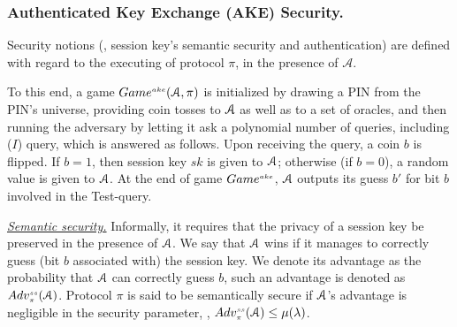 %
%
%
%
%
%
%
%
%
%
%
%
%
%  
%  
%  

 \vspace{-1mm}
\subsubsection{Authenticated Key Exchange (AKE)  Security.} Security notions (\ie, session key's semantic security and authentication) are defined with regard to the executing of protocol $\pi$, in the presence of   $\mathcal{A}$. 


To this end, a game $Game^{\scriptscriptstyle ake} (\mathcal{A},\pi)$ is initialized by drawing a PIN  from the PIN's universe,
providing coin tosses to $\mathcal{A}$ as well as to a set of oracles, and then running the adversary by letting it ask a polynomial
number of queries, including \test($I$) query, which is answered as follows. Upon receiving the query, a coin $b$ is flipped. If $b=1$, then session key $sk$ is given to $\mathcal{A}$; otherwise (if $b=0$), a random value is given to $\mathcal{A}$. At the end of game $Game^{\scriptscriptstyle ake}$, $\mathcal{A}$  outputs its guess $b'$ for bit $b$ involved in the Test-query. 



\noindent\underline{\textit{Semantic security.}} Informally, it requires that the privacy of a session key be preserved in the presence of $\mathcal{A}$. We say that $\mathcal{A}$  wins if it manages to correctly guess (bit $b$ associated with) the session key. We denote its advantage as the probability that $\mathcal{A}$  can correctly guess $b$, such an advantage is denoted as  $Adv_{\scriptscriptstyle\pi}^{\scriptscriptstyle ss}(\mathcal{A})$.  Protocol $\pi$ is said to be semantically secure if $\mathcal{A}$'s advantage is negligible in the security parameter, \ie, $Adv_{\scriptscriptstyle\pi}^{\scriptscriptstyle ss}(\mathcal{A})\leq \mu(\lambda)$.



